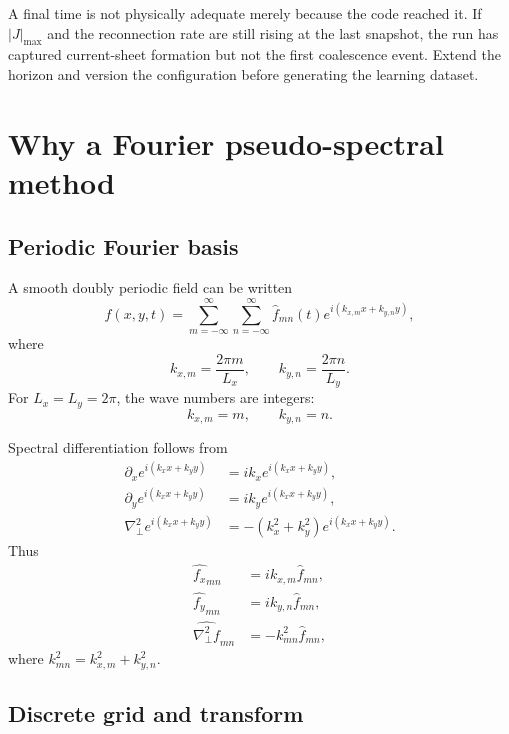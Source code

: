 \documentclass[11pt]{article}
\newcommand{\pd}{\partial}
\newcommand{\Lap}{\nabla_{\!\perp}^{2}}
\begin{document}
\begin{warningbox}[\,: endpoint]
A final time is not physically adequate merely because the code reached it. If $|J|_{\max}$ and the reconnection rate are still rising at the last snapshot, the run has captured current-sheet formation but not the first coalescence event. Extend the horizon and version the configuration before generating the learning dataset.
\end{warningbox}

\section{Why a Fourier pseudo-spectral method}
\label{sec:fourier}

\subsection{Periodic Fourier basis}

A smooth doubly periodic field can be written
\begin{equation}
f(x,y,t)=
\sum_{m=-\infty}^{\infty}
\sum_{n=-\infty}^{\infty}
\widehat f_{mn}(t)
e^{i(k_{x,m}x+k_{y,n}y)},
\end{equation}
where
\begin{equation}
k_{x,m}=\frac{2\pi m}{L_x},
\qquad
k_{y,n}=\frac{2\pi n}{L_y}.
\end{equation}
For $L_x=L_y=2\pi$, the wave numbers are integers:
\begin{equation}
k_{x,m}=m,\qquad k_{y,n}=n.
\end{equation}

Spectral differentiation follows from
\begin{align}
\pd_x e^{i(k_xx+k_yy)}
&=ik_xe^{i(k_xx+k_yy)},\\
\pd_y e^{i(k_xx+k_yy)}
&=ik_ye^{i(k_xx+k_yy)},\\
\Lap e^{i(k_xx+k_yy)}
&=-(k_x^2+k_y^2)e^{i(k_xx+k_yy)}.
\end{align}
Thus
\begin{align}
\widehat{f_x}_{mn}&=ik_{x,m}\widehat f_{mn},\\
\widehat{f_y}_{mn}&=ik_{y,n}\widehat f_{mn},\\
\widehat{\Lap f}_{mn}&=-k_{mn}^2\widehat f_{mn},
\end{align}
where $k_{mn}^2=k_{x,m}^2+k_{y,n}^2$.

\subsection{Discrete grid and transform}
\end{document}
